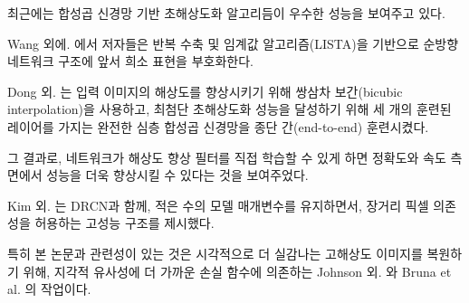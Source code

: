\documentclass[10pt,twocolumn,letterpaper]{article}
\newcommand{\kor}[1]{#1}
\newcommand{\eng}[1]{}
\newcommand{\summary}[1]{}
\begin{document}
\summary{
이웃 임베딩, 커널 능선 회귀, 가우시안 프로세스 회귀, 랜덤 포레스트 방법에 대한 간단한 소개
}

\eng{
Recently \ac{CNN} based \ac{SR} algorithms have shown excellent performance.
}\kor{
최근에는 \ac{합성곱 신경망} 기반 \ac{초해상도화} 알고리듬이 우수한 성능을 보여주고 있다.
}
\eng{
In Wang et al. \cite{Wang2015} the authors encode a sparse representation prior into their feed-forward network architecture based on the learned iterative shrinkage and thresholding algorithm (LISTA)
}\kor{
Wang 외에. \cite{Wang2015}에서 저자들은 반복 수축 및 임계값 알고리즘(LISTA)\cite{gregor2010learning}을 기반으로 순방향 네트워크 구조에 앞서 희소 표현을 부호화한다.
}
\eng{
Dong et al. \cite{dong2014learning,dong2016image} used bicubic interpolation to upscale an input image and trained a three layer deep fully convolutional network end-to-end to achieve state-of-the-art \ac{SR} performance.
}\kor{
Dong 외. \cite{dong2014learning,dong2016image}는 입력 이미지의 해상도를 향상시키기 위해 쌍삼차 보간(bicubic interpolation)을 사용하고, 최첨단 \ac{초해상도화} 성능을 달성하기 위해 세 개의 훈련된 레이어를 가지는 완전한 심층 합성곱 신경망을 종단 간(end-to-end) 훈련시켰다.
}
\eng{
Subsequently, it was shown that enabling the network to learn the upscaling filters directly can further increase performance both in terms of accuracy and speed \cite{dong2016accelerating,Shi2016ESPCN,Wang2016}.
}\kor{
그 결과로, 네트워크가 해상도 향상 필터를 직접 학습할 수 있게 하면 정확도와 속도 측면에서 성능을 더욱 향상시킬 수 있다는 것을 보여주었다.
}
\eng{
With their \ac{DRCN}, Kim et al. \cite{kim2016deeply} presented a highly performant architecture that allows for long-range pixel dependencies while keeping the number of model parameters small.
}\kor{
Kim 외. \cite{kim2016deeply}는 \ac{DRCN}과 함께, 적은 수의 모델 매개변수를 유지하면서, 장거리 픽셀 의존성을 허용하는 고성능 구조를 제시했다.
}
\eng{
Of particular relevance for our paper are the works by Johnson et al. \cite{Johnson16PercepLoss} and Bruna et al. \cite{bruna2016super}, who rely on a loss function closer to perceptual similarity to recover visually more convincing \ac{HR} images.
}\kor{
특히 본 논문과 관련성이 있는 것은 시각적으로 더 실감나는 \ac{고해상도} 이미지를 복원하기 위해, 지각적 유사성에 더 가까운 손실 함수에 의존하는 Johnson 외. \cite{Johnson16PercepLoss}와 Bruna et al. \cite{bruna2016super}의 작업이다.
}
\end{document}
